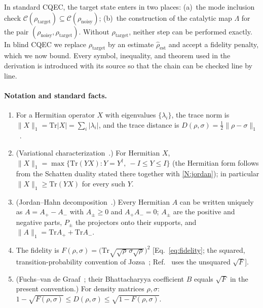 \documentclass[pra,twocolumn,superscriptaddress,longbibliography,floatfix,nofootinbib]{revtex4-2}
\newcommand{\CC}{\mathcal{C}}
\newcommand{\tr}{\mathrm{Tr}}
\newcommand{\rhot}{\rho_\mathrm{target}}
\newcommand{\rhon}{\rho_\mathrm{noisy}}
\newcommand{\rhoe}{\hat{\rho}_\mathrm{est}}
\begin{document}
In standard CQEC, the target state enters in two places:
(a)~the mode inclusion check $\CC(\rhot) \subseteq \CC(\rhon)$;
(b)~the construction of the catalytic map $\Lambda$ for the pair $(\rhon,\rhot)$.
Without $\rhot$, neither step can be performed exactly.
In blind CQEC we replace $\rhot$ by an estimate $\rhoe$ and accept a fidelity penalty, which we now bound.
Every symbol, inequality, and theorem used in the derivation is introduced with its source so that the chain can be checked line by line.

\paragraph{Notation and standard facts.}
\begin{enumerate}[label=(N\arabic*),leftmargin=3em]
\item \label{N:norm} For a Hermitian operator $X$ with eigenvalues $\{\lambda_i\}$, the trace norm is $\|X\|_1 = \tr|X| = \sum_i |\lambda_i|$, and the trace distance is $D(\rho,\sigma) = \tfrac12\|\rho - \sigma\|_1$~\cite[Sec.~9.2]{NielsenChuang2010}.
\item \label{N:dual} (Variational characterization~\cite[Sec.~1.1.3, Eqs.~(1.173) and~(1.182)]{Watrous2018}.) For Hermitian $X$, $\|X\|_1 = \max\{\tr(YX) : Y = Y^\dagger,\ -I \leq Y \leq I\}$ (the Hermitian form follows from the Schatten duality stated there together with \ref{N:jordan}); in particular $\|X\|_1 \geq \tr(YX)$ for every such $Y$.
\item \label{N:jordan} (Jordan--Hahn decomposition~\cite[Sec.~1.1.3, Eqs.~(1.143)--(1.144)]{Watrous2018}.) Every Hermitian $A$ can be written uniquely as $A = A_+ - A_-$ with $A_\pm \geq 0$ and $A_+A_- = 0$; $A_\pm$ are the positive and negative parts, $P_\pm$ the projectors onto their supports, and $\|A\|_1 = \tr A_+ + \tr A_-$.
\item \label{N:fid} The fidelity is $F(\rho,\sigma) = \bigl(\tr\sqrt{\sqrt\rho\,\sigma\sqrt\rho}\bigr)^2$ [Eq.~\eqref{eq:fidelity}; the squared, transition-probability convention of Jozsa~\cite{Jozsa1994}; Ref.~\cite{NielsenChuang2010} uses the unsquared $\sqrt{F}$].
\item \label{N:fvg} (Fuchs--van de Graaf~\cite[Thm.~1, Eq.~(46)]{FuchsGraaf1999}; their Bhattacharyya coefficient $B$ equals $\sqrt{F}$ in the present convention.) For density matrices $\rho,\sigma$: $1 - \sqrt{F(\rho,\sigma)} \leq D(\rho,\sigma) \leq \sqrt{1 - F(\rho,\sigma)}$.
\end{enumerate}
\end{document}
